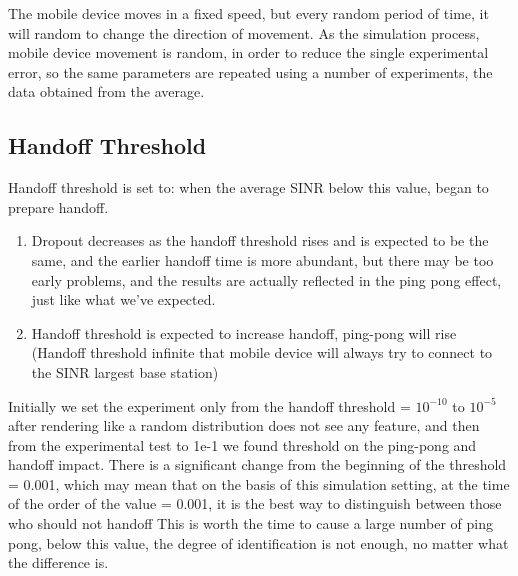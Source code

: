 \documentclass[a4paper]{IEEEtran}
\begin{document}
The mobile device moves in a fixed speed, but every random period of time, it will random to change the direction of movement. As the simulation process, mobile device movement is random, in order to reduce the single experimental error, so the same parameters are repeated using a number of experiments, the data obtained from the average.
\subsection{Handoff Threshold}
Handoff threshold is set to: when the average SINR below this value, began to prepare handoff.
\begin{enumerate}
\item{Dropout decreases as the handoff threshold rises and is expected to be the same, and the earlier handoff time is more abundant, but there may be too early problems, and the results are actually reflected in the ping pong effect, just like what we've expected.}
\item{Handoff threshold is expected to increase handoff, ping-pong will rise
(Handoff threshold infinite that mobile device will always try to connect to the SINR largest base station)}
\end{enumerate}
Initially we set the experiment only from the handoff threshold = $10^{-10}$ to $10^{-5}$ after rendering like a random distribution does not see any feature, and then from the experimental test to 1e-1 we found threshold on the ping-pong and handoff impact. There is a significant change from the beginning of the threshold = 0.001, which may mean that on the basis of this simulation setting, at the time of the order of the value = 0.001, it is the best way to distinguish between those who should not handoff This is worth the time to cause a large number of ping pong, below this value, the degree of identification is not enough, no matter what the difference is.
\end{document}

